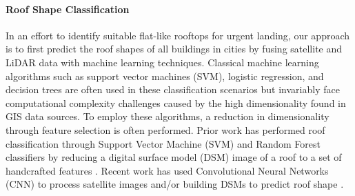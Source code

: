 


\paragraph{Roof Shape Classification}




In an effort to identify suitable flat-like rooftops for urgent landing, our approach is to first predict the roof shapes of all buildings in cities by fusing satellite and LiDAR data with machine learning techniques. %
Classical machine learning algorithms such as support vector machines (SVM), logistic regression, and decision trees are often used in these classification scenarios but invariably face computational complexity challenges caused by the high dimensionality found in GIS data sources.   To employ these algorithms, a reduction in dimensionality through feature selection is often performed. Prior work has performed roof classification through Support Vector Machine (SVM) and Random Forest classifiers by reducing a digital surface model (DSM) image of a roof to a set of handcrafted features \cite{mohajeri_city-scale_2018, assouline_building_2017}. Recent work has used Convolutional Neural Networks (CNN) to process satellite images and/or building DSMs to predict roof shape \cite{partovi_roof_2017, alidoost_knowledge_2016}.

